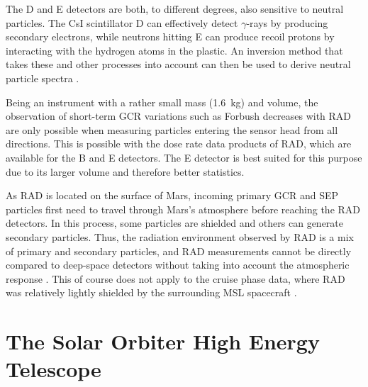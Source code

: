 The D and E detectors are both, to different degrees, also sensitive to neutral particles. The CsI scintillator D can effectively detect $\gamma$-rays by producing secondary electrons, while neutrons hitting E can produce recoil protons by interacting with the hydrogen atoms in the plastic. An inversion method that takes these and other processes into account can then be used to derive neutral particle spectra \citep{Koehler-2011}.

Being an instrument with a rather small mass (\SI{1.6}{\kilogram}) and volume, the observation of short-term \ac{GCR} variations such as Forbush decreases with \ac{RAD} are only possible when measuring particles entering the sensor head from all directions. This is possible with the dose rate data products of \ac{RAD}, which are available for the B and E detectors. The E detector is best suited for this purpose due to its larger volume and therefore better statistics.

As \ac{RAD} is located on the surface of Mars, incoming primary \ac{GCR} and \ac{SEP} particles first need to travel through Mars's atmosphere before reaching the \ac{RAD} detectors. In this process, some particles are shielded and others can generate secondary particles. Thus, the radiation environment observed by \ac{RAD} is a mix of primary and secondary particles, and \ac{RAD} measurements cannot be directly compared to deep-space detectors without taking into account the atmospheric response \citep[see e.g.][]{Guo-2017,Guo-2019}. This of course does not apply to the cruise phase data, where \ac{RAD} was relatively lightly shielded by the surrounding \ac{MSL} spacecraft \citep{Zeitlin-2013-cruise,guo2015cruise}.


\section{The Solar Orbiter High Energy Telescope}
\label{sec:solohet}

